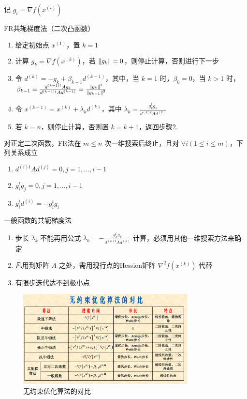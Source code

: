 \begin{remark}
    记 $g_i = \nabla f(x^{(i)})$

    FR共轭梯度法（二次凸函数）\begin{enumerate}
        \item 给定初始点 $x^{(1)}$，置 $k = 1$
        \item 计算 $g_k = \nabla f(x^{(k)})$，若 $\norm{g_k} = 0$，则停止计算，否则进行下一步
        \item 令 $d^{(k)} = -g_k + \beta_{k - 1}d^{(k - 1)}$，其中，当 $k = 1$ 时，$\beta_0 = 0$，当 $k > 1$ 时，$\beta_{k - 1} = \frac{d^{(k - 1)t}Ag_k}{d^{(k - 1)t}Ad^{(k - 1)}} = \frac{\norm{g_k}^2}{\norm{g_{k - 1}}^2}$
        \item 令 $x^{(k + 1)} = x^{(k)} + \lambda_kd^{(k)}$，其中 $\lambda_k = \frac{g_k^tg_k}{d^{(k)t}Ad^{(k)}}$
        \item 若 $k = n$，则停止计算，否则置 $k = k + 1$，返回步骤2.
    \end{enumerate}
\end{remark}

\begin{theorem}
    对正定二次函数，FR法在 $m \le n$ 次一维搜索后终止，且对 $\forall i(1 \le i \le m)$，下列关系成立
    \begin{enumerate}
        \item $d^{(i)t}Ad^{(j)} = 0, j = 1, \dots, i - 1$
        \item $g_i^tg_j = 0, j = 1, \dots, i - 1$
        \item $g_i^td^{(i)} = -g_i^tg_i$
    \end{enumerate}
\end{theorem}

\begin{remark}
    一般函数的共轭梯度法\begin{enumerate}
        \item 步长 $\lambda_k$ 不能再用公式 $\lambda_k = -\frac{g_k^tg_k}{d^{(k)t}Ad^{(k)}}$ 计算，必须用其他一维搜索方法来确定
        \item 凡用到矩阵 $A$ 之处，需用现行点的Hession矩阵 $\nabla^2f(x^{(k)})$ 代替
        \item 有限步迭代达不到极小点
    \end{enumerate}
\end{remark}

\begin{figure}[htbp]
    \centering
    \includegraphics[width=0.8\textwidth]{./figures/img3.png}
    \caption{无约束优化算法的对比 \label{fig3}}
\end{figure}

